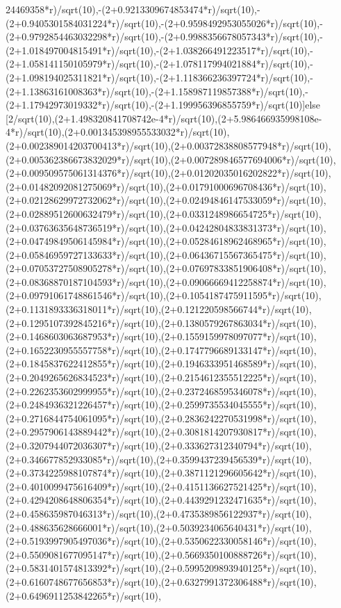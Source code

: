 \documentclass[a4paper,10pt]{article}
\begin{document}
\begin{eulernotebook}
\begin{eulercomment}
\begin{eulercomment}
\begin{eulercomment}
\begin{eulercomment}
\begin{eulercomment}
\begin{eulercomment}
\begin{eulercomment}
\begin{eulercomment}
\begin{eulercomment}
\begin{eulercomment}
\begin{eulercomment}
\begin{eulercomment}
\begin{eulercomment}
\begin{eulercomment}
\begin{eulercomment}
\begin{eulercomment}
\begin{euleroutput}
24469358*r)/sqrt(10),-(2+0.9213309674853474*r)/sqrt(10),-(2+0.9405301584031224*r)/sqrt(10),-(2+0.9598492953055026*r)/sqrt(10),-(2+0.9792854463032298*r)/sqrt(10),-(2+0.9988356678057343*r)/sqrt(10),-(2+1.018497004815491*r)/sqrt(10),-(2+1.038266491223517*r)/sqrt(10),-(2+1.058141150105979*r)/sqrt(10),-(2+1.078117994021884*r)/sqrt(10),-(2+1.098194025311821*r)/sqrt(10),-(2+1.118366236397724*r)/sqrt(10),-(2+1.13863161008363*r)/sqrt(10),-(2+1.158987119857388*r)/sqrt(10),-(2+1.17942973019332*r)/sqrt(10),-(2+1.199956396855759*r)/sqrt(10)]else [2/sqrt(10),(2+1.498320841708742e-4*r)/sqrt(10),(2+5.986466935998108e-4*r)/sqrt(10),(2+0.001345398955533032*r)/sqrt(10),(2+0.002389014203700413*r)/sqrt(10),(2+0.00372838808577948*r)/sqrt(10),(2+0.005362386673832029*r)/sqrt(10),(2+0.007289846577694006*r)/sqrt(10),(2+0.009509575061314376*r)/sqrt(10),(2+0.01202035016202822*r)/sqrt(10),(2+0.01482092081275069*r)/sqrt(10),(2+0.01791000696708436*r)/sqrt(10),(2+0.02128629972732062*r)/sqrt(10),(2+0.02494846147533059*r)/sqrt(10),(2+0.02889512600632479*r)/sqrt(10),(2+0.0331248986654725*r)/sqrt(10),(2+0.03763635648736519*r)/sqrt(10),(2+0.04242804833831373*r)/sqrt(10),(2+0.04749849506145984*r)/sqrt(10),(2+0.05284618962468965*r)/sqrt(10),(2+0.05846959727133633*r)/sqrt(10),(2+0.06436715567365475*r)/sqrt(10),(2+0.07053727508905278*r)/sqrt(10),(2+0.07697833851906408*r)/sqrt(10),(2+0.08368870187104593*r)/sqrt(10),(2+0.09066669412258874*r)/sqrt(10),(2+0.09791061748861546*r)/sqrt(10),(2+0.1054187475911595*r)/sqrt(10),(2+0.1131893336318011*r)/sqrt(10),(2+0.121220598566744*r)/sqrt(10),(2+0.1295107392845216*r)/sqrt(10),(2+0.1380579267863034*r)/sqrt(10),(2+0.1468603063687953*r)/sqrt(10),(2+0.1559159978097077*r)/sqrt(10),(2+0.1652230955557758*r)/sqrt(10),(2+0.1747796689133147*r)/sqrt(10),(2+0.1845837622412855*r)/sqrt(10),(2+0.1946333951468589*r)/sqrt(10),(2+0.2049265626834523*r)/sqrt(10),(2+0.2154612355512225*r)/sqrt(10),(2+0.2262353602999955*r)/sqrt(10),(2+0.2372468595346078*r)/sqrt(10),(2+0.2484936321226457*r)/sqrt(10),(2+0.2599735534045555*r)/sqrt(10),(2+0.2716844754061095*r)/sqrt(10),(2+0.2836242270531998*r)/sqrt(10),(2+0.2957906143889442*r)/sqrt(10),(2+0.3081814207930817*r)/sqrt(10),(2+0.3207944072036307*r)/sqrt(10),(2+0.333627312340794*r)/sqrt(10),(2+0.346677852933085*r)/sqrt(10),(2+0.3599437239456539*r)/sqrt(10),(2+0.3734225988107874*r)/sqrt(10),(2+0.3871121296605642*r)/sqrt(10),(2+0.4010099475616409*r)/sqrt(10),(2+0.4151136627521425*r)/sqrt(10),(2+0.4294208648806354*r)/sqrt(10),(2+0.4439291232471635*r)/sqrt(10),(2+0.458635987046313*r)/sqrt(10),(2+0.4735389856122937*r)/sqrt(10),(2+0.488635628666001*r)/sqrt(10),(2+0.5039234065640431*r)/sqrt(10),(2+0.5193997905497036*r)/sqrt(10),(2+0.5350622330058146*r)/sqrt(10),(2+0.5509081677095147*r)/sqrt(10),(2+0.5669350100888726*r)/sqrt(10),(2+0.5831401574813392*r)/sqrt(10),(2+0.5995209893940125*r)/sqrt(10),(2+0.6160748677656853*r)/sqrt(10),(2+0.6327991372306488*r)/sqrt(10),(2+0.6496911253842265*r)/sqrt(10),
\end{euleroutput}
\end{eulercomment}
\end{eulercomment}
\end{eulercomment}
\end{eulercomment}
\end{eulercomment}
\end{eulercomment}
\end{eulercomment}
\end{eulercomment}
\end{eulercomment}
\end{eulercomment}
\end{eulercomment}
\end{eulercomment}
\end{eulercomment}
\end{eulercomment}
\end{eulercomment}
\end{eulercomment}
\end{eulernotebook}
\end{document}
